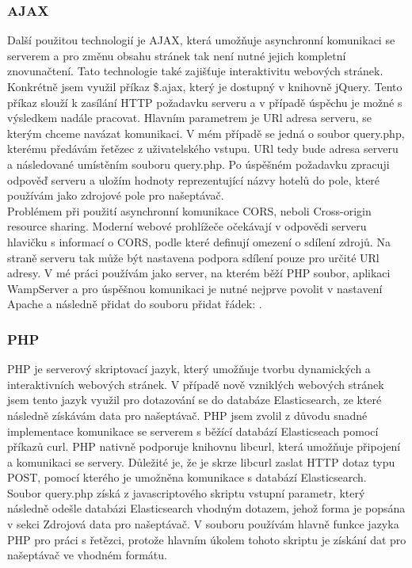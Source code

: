 \documentclass[czech,BP]{thesiskiv}
\begin{document}
\subsubsection{AJAX}
Další použitou technologií je AJAX, která umožňuje asynchronní komunikaci se serverem a pro změnu obsahu stránek tak není nutné jejich kompletní znovunačtení. Tato technologie také zajišťuje interaktivitu webových stránek. Konkrétně jsem využil příkaz \$.ajax, který je dostupný v knihovně jQuery. Tento příkaz slouží k zasílání HTTP požadavku serveru a v případě úspěchu je možné s výsledkem nadále pracovat. Hlavním parametrem je URl adresa serveru, se kterým chceme navázat komunikaci. V mém případě se jedná o soubor query.php, kterému předávám řetězec z uživatelského vstupu. URl tedy bude adresa serveru a následované umístěním souboru query.php. Po úspěšném požadavku zpracuji odpověď serveru a uložím hodnoty reprezentující názvy hotelů do pole, které používám jako zdrojové pole pro našeptávač.
\\
Problémem při použití asynchronní komunikace CORS, neboli Cross-origin resource sharing. Moderní webové prohlížeče očekávají v odpovědi serveru hlavičku s informací o CORS, podle které definují omezení o sdílení zdrojů. Na straně serveru tak může být nastavena podpora sdílení pouze pro určité URl adresy. V mé práci používám jako server, na kterém běží PHP soubor, aplikaci WampServer a pro úspěšnou komunikaci je nutné nejprve povolit v nastavení Apache  a následně přidat do souboru  přidat řádek: .
\subsubsection{PHP}
PHP je serverový skriptovací jazyk, který umožňuje tvorbu dynamických a interaktivních webových stránek.\cite{PHP} V případě nově vzniklých webových stránek jsem tento jazyk využil pro dotazování se do databáze Elasticsearch, ze které následně získávám data pro našeptávač. PHP jsem zvolil z důvodu snadné implementace komunikace se serverem s běžící databází Elasticseach pomocí příkazů curl. PHP nativně podporuje knihovnu libcurl, která umožňuje připojení a komunikaci se servery.\cite{PHP_libcurl} Důležité je, že je skrze libcurl zaslat HTTP dotaz typu POST, pomocí kterého je umožněna komunikace s databází Elasticsearch.
\\
Soubor query.php získá z javascriptového skriptu vstupní parametr, který následně odešle databázi Elasticsearch vhodným dotazem, jehož forma je popsána v sekci Zdrojová data pro našeptávač. V souboru používám hlavně funkce jazyka PHP pro  práci s řetězci, protože hlavním úkolem tohoto skriptu je získání dat pro našeptávač ve vhodném formátu.
\end{document}
